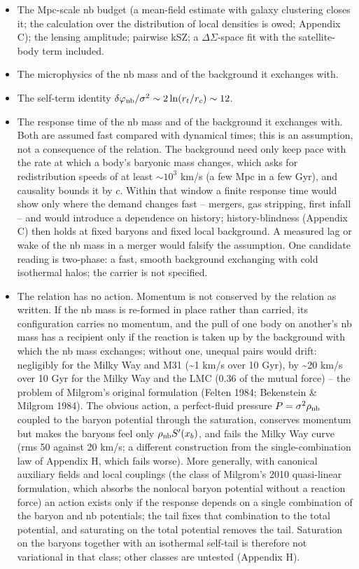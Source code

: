 \documentclass[
  10pt,
]{article}
\begin{document}
\begin{itemize}
\item The Mpc-scale nb budget (a mean-field estimate with galaxy clustering closes it; the calculation over the distribution of local densities is owed; Appendix C); the lensing amplitude; pairwise kSZ; a $\Delta\Sigma$-space fit with the satellite-body term included.
\item The microphysics of the nb mass and of the background it exchanges with.
\item The self-term identity $\delta\varphi_{\rm nb}/\sigma^2\sim 2\ln(r_t/r_c)\sim 12$.
\item The response time of the nb mass and of the background it exchanges with. Both are assumed fast compared with dynamical times; this is an assumption, not a consequence of the relation. The background need only keep pace with the rate at which a body's baryonic mass changes, which asks for redistribution speeds of at least $\sim10^3$ km/s (a few Mpc in a few Gyr), and causality bounds it by $c$. Within that window a finite response time would show only where the demand changes fast -- mergers, gas stripping, first infall -- and would introduce a dependence on history; history-blindness (Appendix C) then holds at fixed baryons and fixed local background. A measured lag or wake of the nb mass in a merger would falsify the assumption. One candidate reading is two-phase: a fast, smooth background exchanging with cold isothermal halos; the carrier is not specified.
\item The relation has no action. Momentum is not conserved by the relation as written. If the nb mass is re-formed in place rather than carried, its configuration carries no momentum, and the pull of one body on another's nb mass has a recipient only if the reaction is taken up by the background with which the nb mass exchanges; without one, unequal pairs would drift: negligibly for the Milky Way and M31 (\textasciitilde{}1 km/s over 10 Gyr), by \textasciitilde{}20 km/s over 10 Gyr for the Milky Way and the LMC (0.36 of the mutual force) -- the problem of Milgrom's original formulation (Felten 1984; Bekenstein \& Milgrom 1984). The obvious action, a perfect-fluid pressure $P=\sigma^2\rho_{\rm nb}$ coupled to the baryon potential through the saturation, conserves momentum but makes the baryons feel only $\rho_{\rm nb}S'(x_b)$, and fails the Milky Way curve (rms 50 against 20 km/s; a different construction from the single-combination law of Appendix H, which fails worse). More generally, with canonical auxiliary fields and local couplings (the class of Milgrom's 2010 quasi-linear formulation, which absorbs the nonlocal baryon potential without a reaction force) an action exists only if the response depends on a single combination of the baryon and nb potentials; the tail fixes that combination to the total potential, and saturating on the total potential removes the tail. Saturation on the baryons together with an isothermal self-tail is therefore not variational in that class; other classes are untested (Appendix H).

\end{itemize}
\end{document}

